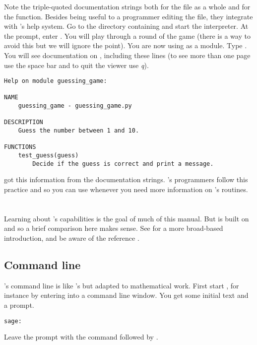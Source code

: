 Note the triple-quoted documentation strings both for the 
file as a whole and for the function.
Besides being useful to a programmer editing the file, 
they integrate with \python's help system. 
Go to the directory containing  and start 
the \python{} interpreter.
At the \inlinecode{>>>} prompt, enter .
You will play through a round of the game (there is a way to avoid this
but we will ignore the point).
You are now using  as a module.
Type
.
You will see documentation on , 
including these lines
(to see more than one page use the space bar and to quit the viewer use \textit{q}).
\begin{lstlisting}
Help on module guessing_game:

NAME
    guessing_game - guessing_game.py

DESCRIPTION
    Guess the number between 1 and 10.

FUNCTIONS
    test_guess(guess)
        Decide if the guess is correct and print a message.
\end{lstlisting}
\python{} got this information from the documentation strings.
\Sage's programmers follow this practice and so 
you can use  
whenever you need more information on \Sage's routines.





\section{\Sage}
Learning about \Sage's capabilities is the goal of much of this manual.
But \Sage{} is built on \python{} and so a brief comparison here makes sense.
See \citep{SageTeam19} for a more broad-based introduction, and 
be aware of the reference \citep{SageTeam19ref}.



\subsection{Command line}
\Sage's command line is like \python's but adapted to 
mathematical work.
First start \Sage,
for instance by entering  into a command line window.
You get some initial text and a prompt.
\begin{lstlisting}[style=python]
sage:  
\end{lstlisting}
Leave the prompt with the command 
followed by .

